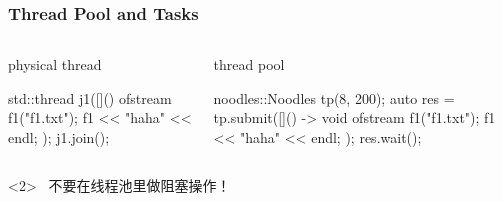 \documentclass[UTF8,lualatex]{ctexbeamer}
\begin{document}

\begin{frame}[fragile]
    \frametitle{Thread Pool and Tasks}
    \begin{columns}
        \scriptsize
        \begin{column}{.5\textwidth}
            \begin{exampleblock}{physical thread}
                \begin{cppcode}
                    std::thread j1([](){
                        ofstream f1("f1.txt");
                        f1 << "haha" << endl;
                    });
                    j1.join();
                \end{cppcode}
            \end{exampleblock}
        \end{column}
        \begin{column}{.5\textwidth}
            \begin{exampleblock}{thread pool}
                \begin{cppcode}
                    noodles::Noodles tp(8, 200);
                    auto res = tp.submit([]() -> void {
                        ofstream f1("f1.txt");
                        f1 << "haha" << endl;
                    });
                    res.wait();
                \end{cppcode}
            \end{exampleblock}
        \end{column}
    \end{columns}
    \begin{alertblock}<2>{~}
        不要在线程池里做阻塞操作！
    \end{alertblock}
\end{frame}

\end{document}
